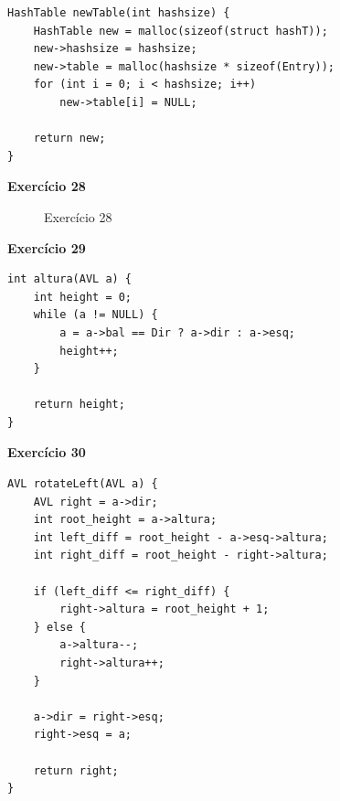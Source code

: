 \documentclass[a4paper,11pt]{article}
\begin{document}
\begin{verbatim}
HashTable newTable(int hashsize) {
	HashTable new = malloc(sizeof(struct hashT));
	new->hashsize = hashsize;
	new->table = malloc(hashsize * sizeof(Entry));
	for (int i = 0; i < hashsize; i++)
		new->table[i] = NULL;
	
	return new;
}
\end{verbatim}

\noindent \textbf{Exercício 28}

\begin{figure}[H]
	\centering
	\caption{Exercício 28}
\end{figure}

\newpage

\noindent \textbf{Exercício 29}

\begin{verbatim}
int altura(AVL a) {
	int height = 0;
	while (a != NULL) {
		a = a->bal == Dir ? a->dir : a->esq;
		height++;
	}
	
	return height;
}
\end{verbatim}

\noindent \textbf{Exercício 30}

\begin{verbatim}
AVL rotateLeft(AVL a) {
	AVL right = a->dir;
	int root_height = a->altura;
	int left_diff = root_height - a->esq->altura;
	int right_diff = root_height - right->altura;
	
	if (left_diff <= right_diff) {
		right->altura = root_height + 1;
	} else {
		a->altura--;
		right->altura++;
	}
	
	a->dir = right->esq;
	right->esq = a;
	
	return right;
}
\end{verbatim}
\end{document}
